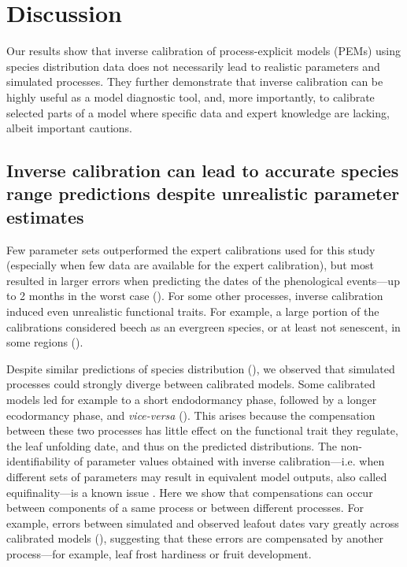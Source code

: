 \documentclass[preprint,12pt,authoryear]{elsarticle}
\begin{document}
\section{Discussion}

Our results show that inverse calibration of process-explicit models (PEMs) using species distribution data does not necessarily lead to realistic parameters and simulated processes. They further demonstrate that inverse calibration can be highly useful as a model diagnostic tool, and, more importantly, to calibrate selected parts of a model where specific data and expert knowledge are lacking, albeit important cautions.

\subsection{Inverse calibration can lead to accurate species range predictions despite unrealistic parameter estimates}

Few parameter sets outperformed the expert calibrations used for this study (especially when few data are available for the expert calibration), but most resulted in larger errors when predicting the dates of the phenological events---up to 2 months in the worst case ().
For some other processes, inverse calibration induced even unrealistic functional traits. For example, a large portion of the calibrations considered beech as an evergreen species, or at least not senescent, in some regions ().

Despite similar predictions of species distribution (), we observed that simulated processes could strongly diverge between calibrated models. Some calibrated models led for example to a short endodormancy phase, followed by a longer ecodormancy phase, and \textit{vice-versa} (). This arises because the compensation between these two processes has little effect on the functional trait they regulate, the leaf unfolding date, and thus on the predicted distributions. The non-identifiability of parameter values obtained with inverse calibration---i.e. when different sets of parameters may result in equivalent model outputs, also called equifinality---is a known issue \citep{He2017, Cameron2022, VanderMeersch2023, Malchow2024}. Here we show that compensations can occur between components of a same process or between different processes. For example, errors between simulated and observed leafout dates vary greatly across calibrated models (), suggesting that these errors are compensated by another process---for example, leaf frost hardiness or fruit development. 
\end{document}
